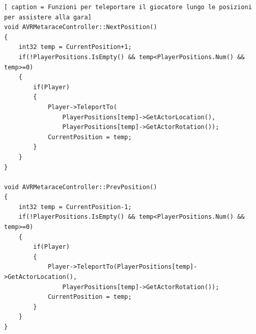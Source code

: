     \begin{lstlisting}[ caption = Funzioni per teleportare il giocatore lungo le posizioni per assistere alla gara]
void AVRMetaraceController::NextPosition()
{
    int32 temp = CurrentPosition+1;
    if(!PlayerPositions.IsEmpty() && temp<PlayerPositions.Num() && temp>=0)
    {
        if(Player)
        {
            Player->TeleportTo(
                PlayerPositions[temp]->GetActorLocation(),
                PlayerPositions[temp]->GetActorRotation());
            CurrentPosition = temp;
        }
    }
}

void AVRMetaraceController::PrevPosition()
{
    int32 temp = CurrentPosition-1;
    if(!PlayerPositions.IsEmpty() && temp<PlayerPositions.Num() && temp>=0)
    {
        if(Player)
        {
            Player->TeleportTo(PlayerPositions[temp]->GetActorLocation(),
                PlayerPositions[temp]->GetActorRotation());
            CurrentPosition = temp;
        }
    }
}
    \end{lstlisting}



